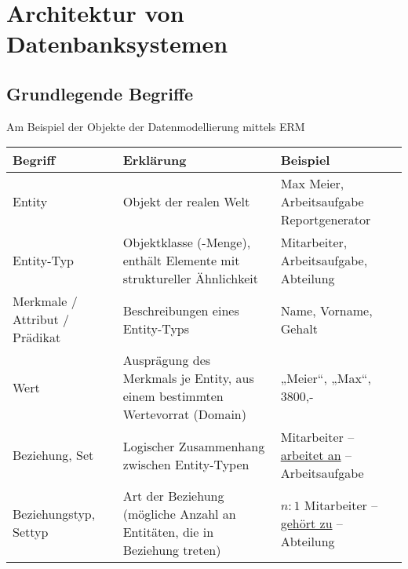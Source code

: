 \section{Architektur von Datenbanksystemen}

\subsection{Grundlegende Begriffe}
Am Beispiel der Objekte der Datenmodellierung mittels ERM\\
\begin{tabular}{>{\raggedright}
p{} | >{\raggedright}
p{} | >{\raggedright}
p{}
}
Begriff & Erklärung & Beispiel\tabularnewline
\hline 
Entity & Objekt der realen Welt & Max Meier, Arbeitsaufgabe Reportgenerator\tabularnewline
Entity-Typ & Objektklasse (-Menge), enthält Elemente mit struktureller Ähnlichkeit & Mitarbeiter, Arbeitsaufgabe, Abteilung \tabularnewline
Merkmale / Attribut / Prädikat & Beschreibungen eines Entity-Typs & Name, Vorname, Gehalt\tabularnewline
Wert & Ausprägung des Merkmals je Entity, aus einem bestimmten Wertevorrat (Domain) & „Meier“, „Max“, 3800,-\tabularnewline
Beziehung, Set & Logischer Zusammenhang zwischen Entity-Typen & Mitarbeiter -- \underline{arbeitet an} -- Arbeitsaufgabe \tabularnewline
Beziehungstyp, Settyp & Art der Beziehung (mögliche Anzahl an Entitäten, die in Beziehung treten) & $n:1$ Mitarbeiter -- \underline{gehört zu} -- Abteilung\tabularnewline
\end{tabular}\\

